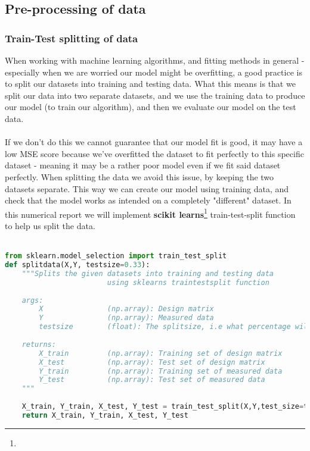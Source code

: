 \documentclass[../main.tex]{subfiles}
\begin{document}
\subsection{Pre-processing of data}
\subsubsection{Train-Test splitting of data}\label{refmethod:train_test}
When working with machine learning algorithms, and fitting methods in general - especially when we are worried our model might be overfitting, a good practice is to split our datasets into training and testing data. 
What this means is that we split our data into two separate datasets, and we use the training data to produce our model (to train our algorithm), and then we evaluate our model on the test data.  \\ \\ If we don't do this we cannot guarantee that our model fit is good, it may have a low MSE score because we've overfitted the dataset to fit perfectly to this specific dataset - meaning it may be a rather poor model even if we fit said dataset perfectly. When splitting the data we avoid this issue, by keeping the two datasets separate. This way we can create our model using training data, and check that the model works as intended on a completely "different" dataset. In this numerical report we will implement \textbf{scikit learns}\footnote{} train-test-split function to help us split the data.\\\\ 
\begin{lstlisting}[language=Python]
from sklearn.model_selection import train_test_split
def splitdata(X,Y, testsize=0.33):
    """Splits the given datasets into training and testing data
                        using sklearns traintestsplit function
                        
    args:
        X               (np.array): Design matrix
        Y               (np.array): Measured data
        testsize        (float): The splitsize, i.e what percentage will be testdata (default = 0.33)
    
    returns:
        X_train         (np.array): Training set of design matrix
        X_test          (np.array): Test set of design matrix
        Y_train         (np.array): Training set of measured data
        Y_test          (np.array): Test set of measured data
    """
    
    X_train, Y_train, X_test, Y_test = train_test_split(X,Y,test_size=testsize)
    return X_train, Y_train, X_test, Y_test
\end{lstlisting}
\vskip0.1in
\end{document}
